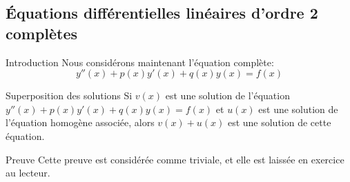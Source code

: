 \documentclass[a4paper]{article}
\begin{document}
\subsection[EDL2 complètes]{Équations différentielles linéaires d'ordre 2 complètes}
\begin{parag}{Introduction}
    Nous considérons maintenant l'équation complète:
\[y''\left(x\right) + p\left(x\right) y'\left(x\right) + q\left(x\right) y\left(x\right) = f\left(x\right)\]
\end{parag}

\begin{parag}{Superposition des solutions}
    Si $v\left(x\right)$ est une solution de l'équation $y''\left(x\right) + p\left(x\right) y'\left(x\right) + q\left(x\right) y\left(x\right) = f\left(x\right)$ et $u\left(x\right)$ est une solution de l'équation homogène associée, alors $v\left(x\right) + u\left(x\right)$ est une solution de cette équation.

    \begin{subparag}{Preuve}
        Cette preuve est considérée comme triviale, et elle est laissée en exercice au lecteur.
    \end{subparag}
\end{parag}
\end{document}

